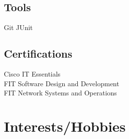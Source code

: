 \documentclass[]{deedy-resume-openfont}
\begin{document}
\begin{minipage}[t]{0.33\textwidth}
\subsection{Tools}
Git \textbullet{} JUnit\\
\vspace{1mm}
\sectionsep



\subsection{Certifications}
Cisco IT Essentials\\
FIT Software Design and Development \\
FIT Network Systems and Operations \\
\sectionsep

\section{Interests/Hobbies}



\end{minipage}
\end{document}
